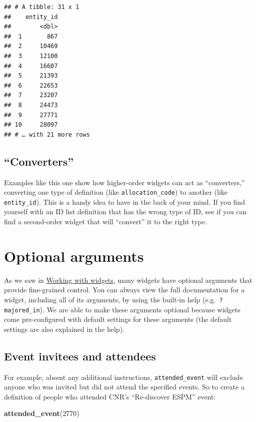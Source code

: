 \documentclass[]{book}
\newenvironment{Shaded}{\begin{snugshade}}{\end{snugshade}}
\newcommand{\DecValTok}[1]{\textcolor[rgb]{0.00,0.00,0.81}{#1}}
\newcommand{\KeywordTok}[1]{\textcolor[rgb]{0.13,0.29,0.53}{\textbf{#1}}}
\newcommand{\NormalTok}[1]{#1}
\begin{document}
\begin{verbatim}
## # A tibble: 31 x 1
##    entity_id
##        <dbl>
##  1       867
##  2     10469
##  3     12100
##  4     16607
##  5     21393
##  6     22653
##  7     23207
##  8     24473
##  9     27771
## 10     28097
## # … with 21 more rows
\end{verbatim}

\hypertarget{non-entity-converters}{%
\section{``Converters''}\label{non-entity-converters}}

Examples like this one show how higher-order widgets can act as ``converters,'' converting one type of definition (like \texttt{allocation\_code}) to another (like \texttt{entity\_id}). This is a handy idea to have in the back of your mind. If you find yourself with an ID list definition that has the wrong type of ID, see if you can find a second-order widget that will ``convert'' it to the right type.

\hypertarget{optional-arguments}{%
\chapter{Optional arguments}\label{optional-arguments}}

As we saw in \protect\hyperlink{detailed-controls}{Working with widgets}, many widgets have optional arguments that provide fine-grained control. You can always view the full documentation for a widget, including all of its arguments, by using the built-in help (e.g.~\texttt{?majored\_in}). We are able to make these arguments optional because widgets come pre-configured with default settings for these arguments (the default settings are also explained in the help).

\hypertarget{opt-events}{%
\section{Event invitees and attendees}\label{opt-events}}

For example, absent any additional instructions, \texttt{attended\_event} will exclude anyone who was invited but did not attend the specified events. So to create a definition of people who attended CNR's ``Re-discover ESPM'' event:

\begin{Shaded}
\begin{Highlighting}[]
\KeywordTok{attended_event}\NormalTok{(}\DecValTok{2770}\NormalTok{)}
\end{Highlighting}
\end{Shaded}
\end{document}
